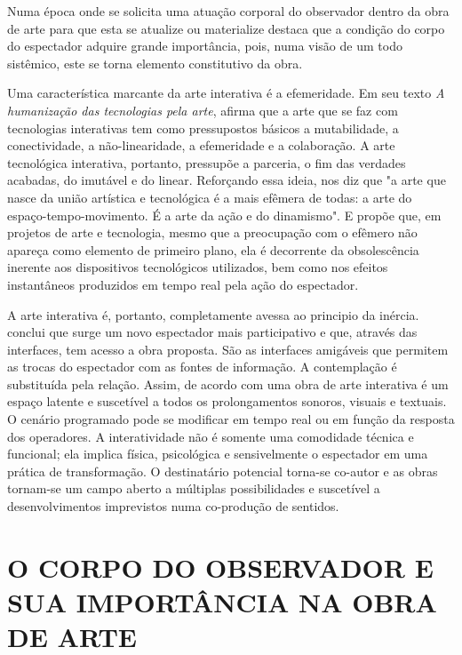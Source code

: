 Numa época onde se solicita uma atuação corporal do observador dentro da obra de arte para que esta se atualize ou materialize  destaca que a condição do corpo do espectador adquire grande importância, pois, numa visão de um todo sistêmico, este se torna elemento constitutivo da obra. 


Uma característica marcante da arte interativa é a efemeridade. Em seu texto \textit{A humanização das tecnologias pela arte},  afirma que a arte que se faz com tecnologias interativas tem como pressupostos básicos a mutabilidade, a conectividade, a não-linearidade, a efemeridade e a colaboração. A arte tecnológica interativa, portanto, pressupõe a parceria, o fim das verdades acabadas, do imutável e do linear. Reforçando essa ideia,  nos diz que "a arte que nasce da união artística e tecnológica é a mais efêmera de todas: a arte do espaço-tempo-movimento. É a arte da ação e do dinamismo". E  propõe que, em projetos de arte e tecnologia, mesmo que a preocupação com o efêmero não apareça como elemento de primeiro plano, ela é decorrente da obsolescência inerente aos dispositivos tecnológicos utilizados, bem como nos efeitos instantâneos produzidos em tempo real pela ação do espectador.

A arte interativa é, portanto, completamente avessa ao principio da inércia.  conclui que surge um novo espectador mais participativo e que, através das interfaces, tem acesso a obra proposta. São as interfaces amigáveis que permitem as trocas do espectador com as fontes de informação. A contemplação é substituída pela relação. Assim, de acordo com  uma obra de arte interativa é um espaço latente e suscetível a todos os prolongamentos sonoros, visuais e textuais. O cenário programado pode se modificar em tempo real ou em função da resposta dos operadores. A interatividade não é somente uma comodidade técnica e funcional; ela implica física, psicológica e sensivelmente o espectador em uma prática de transformação. O destinatário potencial torna-se co-autor e as obras tornam-se um campo aberto a múltiplas possibilidades e suscetível a desenvolvimentos imprevistos numa co-produção de sentidos.	


\section{O CORPO DO OBSERVADOR E SUA IMPORTÂNCIA NA OBRA DE ARTE}
	
